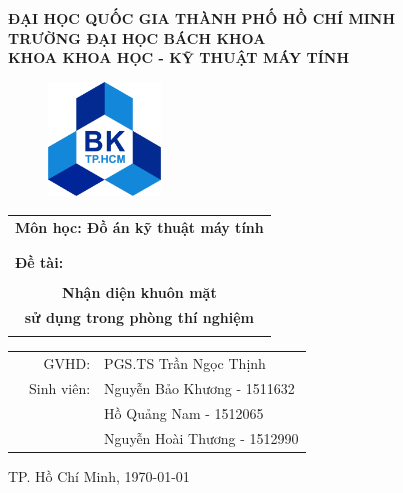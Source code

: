 \documentclass[a4paper]{report}
\newcommand{\monhoc}{Đồ án kỹ thuật máy tính}
\begin{document}
\begin{titlepage}
\begin{center}
\textbf{ĐẠI HỌC QUỐC GIA THÀNH PHỐ HỒ CHÍ MINH \\
TRƯỜNG ĐẠI HỌC BÁCH KHOA \\
KHOA KHOA HỌC - KỸ THUẬT MÁY TÍNH }
\vspace{1cm}

\begin{figure}[h!]
\begin{center}
\includegraphics[width=3cm]{../images/logo/bklogo.png}
\end{center}
\end{figure}

\vspace{1cm}

\begin{tabular}{c}
\multicolumn{1}{l}{\textbf{{\Large Môn học: \monhoc}}}\\
\\
\hline
\\
\multicolumn{1}{l}{\textbf{{\Large Đề tài:}}}\\
\\
\textbf{{\Huge Nhận diện khuôn mặt }}\\
\textbf{{\Huge sử dụng trong phòng thí nghiệm}}\\
\\
\hline
\end{tabular}
\end{center}
\vspace{3cm}

\begin{table}[h]
\begin{tabular}{rrl}
\vspace*{1em}
\hspace{5 cm} & GVHD: & PGS.TS Trần Ngọc Thịnh\\
 & Sinh viên: & Nguyễn Bảo Khương - 1511632 \\
& & Hồ Quảng Nam - 1512065\\
& & Nguyễn Hoài Thương - 1512990\\
\end{tabular}
\end{table}
\vspace*{\fill}
\begin{center}
{\footnotesize TP. Hồ Chí Minh, \today}
\end{center}
\end{titlepage}
\newpage
\tableofcontents
\thispagestyle{empty}
\newpage
\end{document}
